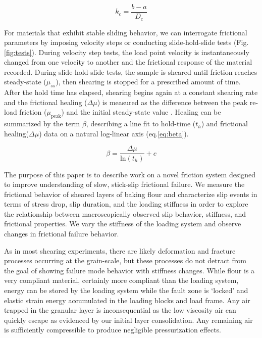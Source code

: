 \begin{equation}
    k_c = \frac{b-a}{D_c}
	\label{eq:kc}
\end{equation}


For materials that exhibit stable sliding behavior, we can interrogate
frictional parameters by imposing velocity steps or conducting slide-hold-slide
tests (Fig.\ref{fig:tests}).  During velocity step tests, the load point
velocity is instantaneously changed from one velocity to another and the
frictional response of the material recorded.  During slide-hold-slide tests,
the sample is sheared until friction reaches steady-state ($\mu_{ss}$), then
shearing is stopped for a prescribed amount of time.  After the hold time has
elapsed, shearing begins again at a constant shearing rate and the frictional
healing ($\Delta \mu$) is measured as the difference between the peak re-load
friction ($\mu_\text{peak}$) and the initial steady-state value
\cite{marone1998laboratory}.  Healing can be summarized by the term $\beta$, describing a
line fit to hold-time ($t_h$) and frictional healing($\Delta \mu$) data on a
natural log-linear axis (eq.\ref{eq:beta}).

\begin{equation}
    \beta = \frac{\Delta \mu}{\text{ln}(t_h)} + c
	\label{eq:beta}
\end{equation}

The purpose of this paper is to describe work on a novel friction system
designed to improve understanding of slow, stick-slip frictional failure. We
measure the frictional behavior of sheared layers of baking flour and
characterize slip events in terms of stress drop, slip duration, and the loading
stiffness in order to explore the relationship between macroscopically observed
slip behavior, stiffness, and frictional properties. We vary the stiffness of
the loading system and observe changes in frictional failure behavior.

As in most shearing experiments, there are likely deformation and fracture
processes occurring at the grain-scale, but these processes do not detract from
the goal of showing failure mode behavior with stiffness changes. While flour is
a very compliant material, certainly more compliant than the loading system,
energy can be stored by the loading system while the fault zone is `locked' and
elastic strain energy accumulated in the loading blocks and load frame. Any air
trapped in the granular layer is inconsequential as the low viscosity air can
quickly escape as evidenced by our initial layer consolidation.  Any remaining
air is sufficiently compressible to produce negligible pressurization effects.

